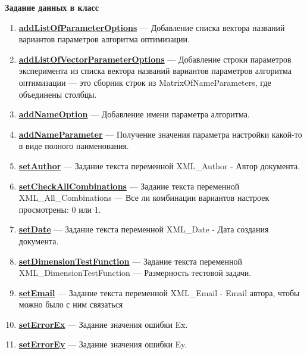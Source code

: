 \documentclass[a4paper,12pt]{article}
\begin{document}
\textbf{Задание данных в класс}
\begin{enumerate}
	
	\item \textbf{\hyperref[addListOfParameterOptions]{addListOfParameterOptions}} --- Добавление списка вектора названий вариантов параметров алгоритма оптимизации.
	
	\item \textbf{\hyperref[addListOfVectorParameterOptions]{addListOfVectorParameterOptions}} --- Добавление строки параметров эксперимента из списка вектора названий вариантов параметров алгоритма оптимизации --- это сборник строк из MatrixOfNameParameters, где объединены столбцы.
	
	\item \textbf{\hyperref[addNameOption]{addNameOption}} --- Добавление имени параметра алгоритма.
	
	\item \textbf{\hyperref[addNameParameter]{addNameParameter}} --- Получение значения параметра настройки какой-то в виде полного наименования.
	
	\item \textbf{\hyperref[setAuthor]{setAuthor}} --- Задание текста переменной XML\_Author - Автор документа.
	
	\item \textbf{\hyperref[setCheckAllCombinations]{setCheckAllCombinations}} --- Задание текста переменной  XML\_All\_Combinations --- Все ли комбинации вариантов настроек просмотрены: 0 или 1.
	
	\item \textbf{\hyperref[setDate]{setDate}} --- Задание текста переменной  XML\_Date - Дата создания документа.
	
	\item \textbf{\hyperref[setDimensionTestFunction]{setDimensionTestFunction}} --- Задание текста переменной  XML\_DimensionTestFunction --- Размерность тестовой задачи.
	
	\item \textbf{\hyperref[setEmail]{setEmail}} --- Задание текста переменной  XML\_Email - Email автора, чтобы можно было с ним связаться
	
	\item \textbf{\hyperref[setErrorEx]{setErrorEx}} --- Задание значения ошибки Ex.
	
	\item \textbf{\hyperref[setErrorEy]{setErrorEy}} --- Задание значения ошибки Ey.
	

\end{enumerate}
\end{document}

